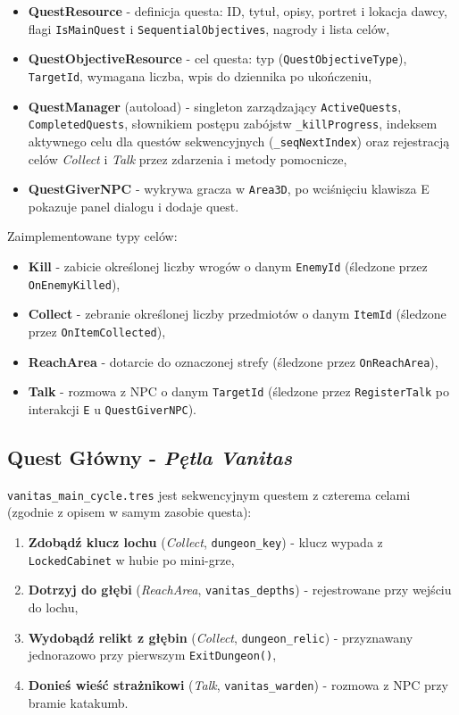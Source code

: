 \begin{itemize}
    \item \textbf{QuestResource} - definicja questa: ID, tytuł, opisy, portret i lokacja dawcy, flagi \texttt{IsMainQuest} i \texttt{SequentialObjectives}, nagrody i lista celów,
    \item \textbf{QuestObjectiveResource} - cel questa: typ (\texttt{QuestObjectiveType}), \texttt{TargetId}, wymagana liczba, wpis do dziennika po ukończeniu,
    \item \textbf{QuestManager} (autoload) - singleton zarządzający \texttt{ActiveQuests}, \texttt{CompletedQuests}, słownikiem postępu zabójstw \texttt{\_killProgress}, indeksem aktywnego celu dla questów sekwencyjnych (\texttt{\_seqNextIndex}) oraz rejestracją celów \textit{Collect} i \textit{Talk} przez zdarzenia i metody pomocnicze,
    \item \textbf{QuestGiverNPC} - wykrywa gracza w \texttt{Area3D}, po wciśnięciu klawisza E pokazuje panel dialogu i dodaje quest.
\end{itemize}

Zaimplementowane typy celów:
\begin{itemize}
    \item \textbf{Kill} - zabicie określonej liczby wrogów o danym \texttt{EnemyId} (śledzone przez \texttt{OnEnemyKilled}),
    \item \textbf{Collect} - zebranie określonej liczby przedmiotów o danym \texttt{ItemId} (śledzone przez \texttt{OnItemCollected}),
    \item \textbf{ReachArea} - dotarcie do oznaczonej strefy (śledzone przez \texttt{OnReachArea}),
    \item \textbf{Talk} - rozmowa z NPC o danym \texttt{TargetId} (śledzone przez \texttt{RegisterTalk} po interakcji \texttt{E} u \texttt{QuestGiverNPC}).
\end{itemize}

\subsection{Quest Główny - \textit{Pętla Vanitas}}

\texttt{vanitas\_main\_cycle.tres} jest sekwencyjnym questem z czterema celami (zgodnie z opisem w samym zasobie questa):
\begin{enumerate}
    \item \textbf{Zdobądź klucz lochu} (\textit{Collect}, \texttt{dungeon\_key}) - klucz wypada z \texttt{LockedCabinet} w hubie po mini-grze,
    \item \textbf{Dotrzyj do głębi} (\textit{ReachArea}, \texttt{vanitas\_depths}) - rejestrowane przy wejściu do lochu,
    \item \textbf{Wydobądź relikt z głębin} (\textit{Collect}, \texttt{dungeon\_relic}) - przyznawany jednorazowo przy pierwszym \texttt{ExitDungeon()},
    \item \textbf{Donieś wieść strażnikowi} (\textit{Talk}, \texttt{vanitas\_warden}) - rozmowa z NPC przy bramie katakumb.
\end{enumerate}

